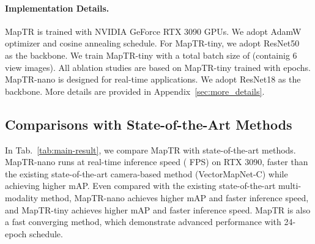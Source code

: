 \documentclass{article} \usepackage{iclr2023_conference,times}
\begin{document}
\paragraph{Implementation Details.}
MapTR is trained with  NVIDIA GeForce RTX 3090 GPUs.
We adopt AdamW \citep{adamw} optimizer and cosine annealing schedule. 
For MapTR-tiny, we adopt ResNet50~\citep{resnet} as the backbone. We train MapTR-tiny with a total batch size of  (containig 6 view images). All ablation studies are based on MapTR-tiny trained with  epochs. MapTR-nano is designed for real-time applications.  We adopt ResNet18 as the backbone. More details are provided in Appendix~\ref{sec:more_details}.



\subsection{Comparisons with State-of-the-Art Methods}
In Tab.~\ref{tab:main-result}, we compare MapTR with state-of-the-art methods. 
MapTR-nano runs at real-time inference speed ( FPS) on RTX 3090,  faster than the existing state-of-the-art camera-based method (VectorMapNet-C) while achieving  higher mAP. 
Even compared with the existing state-of-the-art multi-modality method, MapTR-nano achieves  higher mAP and  faster inference speed, and MapTR-tiny achieves  higher mAP and  faster inference speed. MapTR is also a fast converging method, which demonstrate advanced performance with 24-epoch schedule.
\end{document}
